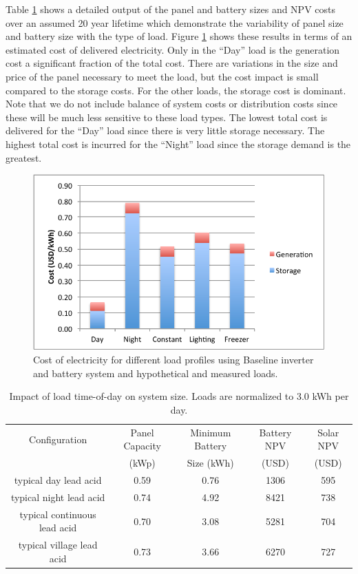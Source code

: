 \documentclass[conference]{IEEEtran}
\begin{document}
Table \ref{tbl_baseline} shows a detailed output of the panel and
battery sizes and NPV costs over an assumed 20 year lifetime
which demonstrate the variability of panel size and battery
size with the type of load.
Figure \ref{fig_baseline} 
shows these results in terms of an estimated cost of delivered
electricity.
Only in the ``Day'' load is the generation cost a significant
fraction of the total cost.
There are variations in the size and price of the panel
necessary to meet the load, but the cost impact is small
compared to the storage costs.
For the other loads, the storage cost is dominant.
Note that we do not include balance of system costs or 
distribution costs since these will be much less sensitive
to these load types.
The lowest total cost is delivered for the ``Day'' load
since there is very little storage necessary.
The highest total cost is incurred for the ``Night'' load since
the storage demand is the greatest.


\begin{figure}[]
\begin{center}
\includegraphics[width=\columnwidth]{figures/baseline.pdf}
\end{center}
\caption{Cost of electricity for different load profiles using Baseline 
inverter and battery system and hypothetical and measured loads.}
\label{fig_baseline}
\end{figure}

\begin{table}
\centering
\begin{tabular}{c c c c c}
Configuration & Panel Capacity & Minimum Battery & Battery NPV & Solar NPV \\
              & (kWp)          & Size (kWh)      & (USD)       & (USD)     \\
\hline
typical day lead acid          & 0.59 & 0.76 & 1306 & 595 \\
typical night lead acid        & 0.74 & 4.92 & 8421 & 738 \\
typical continuous lead acid   & 0.70 & 3.08 & 5281 & 704 \\
typical village lead acid      & 0.73 & 3.66 & 6270 & 727 \\
\end{tabular}
\caption{Impact of load time-of-day on system size.
Loads are normalized to 3.0 kWh per day.}
\label{tbl_baseline}
\end{table}
\end{document}
